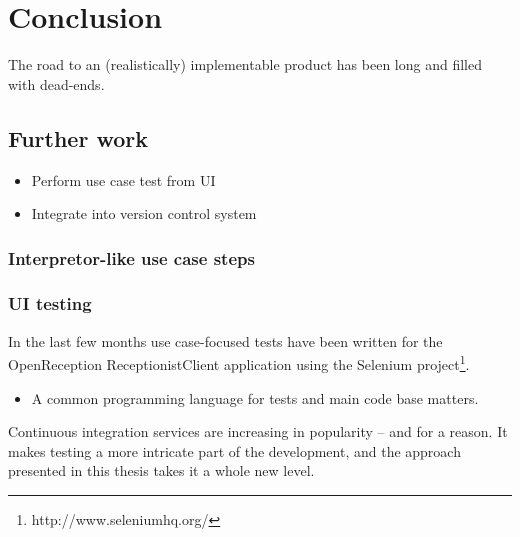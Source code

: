 \chapter{Conclusion}
The road to an (realistically) implementable product has been long and filled with dead-ends.
\section{Further work}
\begin{itemize}
  \item Perform use case test from UI
  \item Integrate into version control system
\end{itemize}

\subsection{Interpretor-like use case steps}

\subsection{UI testing}
In the last few months use case-focused tests have been written for the OpenReception ReceptionistClient application using the Selenium project\footnote{http://www.seleniumhq.org/}.

\begin{itemize}
  \item A common programming language for tests and main code base matters.
\end{itemize}

Continuous integration services are increasing in popularity -- and for a reason. It makes testing a more intricate part of the development, and the approach presented in this thesis takes it a whole new level.

